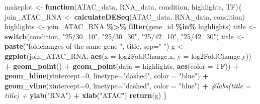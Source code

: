 \documentclass[
]{article}
\newenvironment{Shaded}{\begin{snugshade}}{\end{snugshade}}
\newcommand{\AttributeTok}[1]{\textcolor[rgb]{0.13,0.29,0.53}{#1}}
\newcommand{\CommentTok}[1]{\textcolor[rgb]{0.56,0.35,0.01}{\textit{#1}}}
\newcommand{\ControlFlowTok}[1]{\textcolor[rgb]{0.13,0.29,0.53}{\textbf{#1}}}
\newcommand{\DecValTok}[1]{\textcolor[rgb]{0.00,0.00,0.81}{#1}}
\newcommand{\FunctionTok}[1]{\textcolor[rgb]{0.13,0.29,0.53}{\textbf{#1}}}
\newcommand{\NormalTok}[1]{#1}
\newcommand{\OtherTok}[1]{\textcolor[rgb]{0.56,0.35,0.01}{#1}}
\newcommand{\SpecialCharTok}[1]{\textcolor[rgb]{0.81,0.36,0.00}{\textbf{#1}}}
\newcommand{\StringTok}[1]{\textcolor[rgb]{0.31,0.60,0.02}{#1}}
\begin{document}
\begin{Shaded}
\begin{Highlighting}[]
\NormalTok{makeplot }\OtherTok{\textless{}{-}} \ControlFlowTok{function}\NormalTok{(ATAC\_data, RNA\_data, condition, highlights, TF)\{}
\NormalTok{    join\_ATAC\_RNA }\OtherTok{\textless{}{-}} \FunctionTok{calculateDESeq}\NormalTok{(ATAC\_data, RNA\_data, condition)}
\NormalTok{    highlights }\OtherTok{\textless{}{-}}\NormalTok{ join\_ATAC\_RNA }\SpecialCharTok{\%\textgreater{}\%} \FunctionTok{filter}\NormalTok{(gene\_id }\SpecialCharTok{\%in\%}\NormalTok{ highlights)}
\NormalTok{    title }\OtherTok{\textless{}{-}} \ControlFlowTok{switch}\NormalTok{(condition, }\StringTok{"25/30\_10"}\NormalTok{, }\StringTok{"25/30\_30"}\NormalTok{, }\StringTok{"25/42\_10"}\NormalTok{, }\StringTok{"25/42\_30"}\NormalTok{)}
\NormalTok{    title }\OtherTok{\textless{}{-}} \FunctionTok{paste}\NormalTok{(}\StringTok{"foldchanges of the same gene "}\NormalTok{, title, }\AttributeTok{sep=}\StringTok{" "}\NormalTok{)}
\NormalTok{    g }\OtherTok{\textless{}{-}} \FunctionTok{ggplot}\NormalTok{(join\_ATAC\_RNA, }\FunctionTok{aes}\NormalTok{(}\AttributeTok{x =}\NormalTok{ log2FoldChange.x, }\AttributeTok{y =}\NormalTok{ log2FoldChange.y)) }\SpecialCharTok{+}
      \FunctionTok{geom\_point}\NormalTok{() }\SpecialCharTok{+}
      \FunctionTok{geom\_point}\NormalTok{(}\AttributeTok{data =}\NormalTok{ highlights, }\FunctionTok{aes}\NormalTok{(}\AttributeTok{color =}\NormalTok{ TF)) }\SpecialCharTok{+} 
      \FunctionTok{geom\_hline}\NormalTok{(}\AttributeTok{yintercept=}\DecValTok{0}\NormalTok{, }\AttributeTok{linetype=}\StringTok{"dashed"}\NormalTok{, }\AttributeTok{color =} \StringTok{"blue"}\NormalTok{) }\SpecialCharTok{+}
      \FunctionTok{geom\_vline}\NormalTok{(}\AttributeTok{xintercept=}\DecValTok{0}\NormalTok{, }\AttributeTok{linetype=}\StringTok{"dashed"}\NormalTok{, }\AttributeTok{color =} \StringTok{"blue"}\NormalTok{) }\SpecialCharTok{+}
      \CommentTok{\#labs(title = title) +}
      \FunctionTok{ylab}\NormalTok{(}\StringTok{"RNA"}\NormalTok{) }\SpecialCharTok{+} 
      \FunctionTok{xlab}\NormalTok{(}\StringTok{"ATAC"}\NormalTok{) }
    \FunctionTok{return}\NormalTok{(g)}
\NormalTok{\}}


\end{Highlighting}
\end{Shaded}
\end{document}
